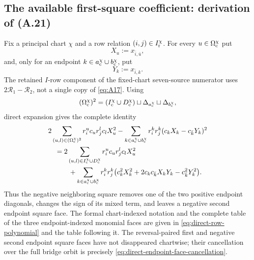 \documentclass[11pt]{article}
\begin{document}
\subsection{The available first-square coefficient: derivation of (A.21)}

Fix a principal chart $\chi$ and a row relation
$(i,j)\in I_{\rm r}^\chi$.  For every
$u\in\Omega_{\rm c}^\chi$ put
\[
X_u:=x_{\bar i,\bar u},
\]
and, only for an endpoint $k\in a_{\rm c}^\chi\cup b_{\rm c}^\chi$, put
\[
Y_k:=x_{\bar i,k}.
\]
The retained $I$-row component of the fixed-chart seven-source numerator
uses $2\mathcal R_1-\mathcal R_2$, not a single copy of
\eqref{eq:A17}.
Using
\[
(\Omega_{\rm c}^\chi)^2
=(I_{\rm c}^\chi\cup D_{\rm c}^\chi)
\sqcup\Delta_{a_{\rm c}^\chi}\sqcup\Delta_{b_{\rm c}^\chi},
\]
direct expansion gives the complete identity
\[
\begin{aligned}
&2\sum_{(u,l)\in(\Omega_{\rm c}^\chi)^2}
 r_i^uc_u r_j^lc_lX_u^2
-\sum_{k\in a_{\rm c}^\chi\cup b_{\rm c}^\chi}
 r_i^kr_j^k(c_kX_k-c_{\bar k}Y_k)^2\\
&\quad=
2\sum_{(u,l)\in I_{\rm c}^\chi\cup D_{\rm c}^\chi}
 r_i^uc_u r_j^lc_lX_u^2\\
&\qquad\quad+
\sum_{k\in a_{\rm c}^\chi\cup b_{\rm c}^\chi}
r_i^kr_j^k\bigl(
c_k^2X_k^2+2c_kc_{\bar k}X_kY_k-c_{\bar k}^2Y_k^2
\bigr).
\end{aligned}
\]
Thus the negative neighboring square removes one of the two positive
endpoint diagonals, changes the sign of its mixed term, and leaves a negative
second endpoint square face.  The formal chart-indexed notation and the
complete table of the three endpoint-indexed monomial faces are given in
\eqref{eq:direct-row-polynomial} and the table following it.  The
reversal-paired first and negative second endpoint square faces have not
disappeared chartwise; their cancellation over the full bridge orbit is
precisely \eqref{eq:direct-endpoint-face-cancellation}.
\end{document}
